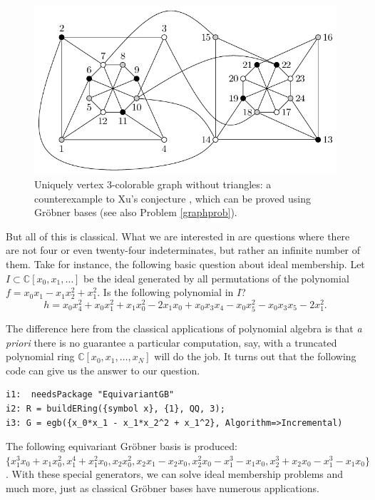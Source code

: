 \begin{figure}
\begin{center}
\includegraphics[width=.8 \linewidth]{akbarigraph.pdf}
\caption{Uniquely vertex 3-colorable graph without triangles: a counterexample \cite{akbari2001kr} to Xu's conjecture \cite{shaoji1990size}, which can be proved using Gr\"obner bases \cite{hillar2008algebraic} (see also Problem \ref{graphprob}).}\label{graph}
\end{center}
\end{figure}

But all of this is classical.  What we are interested in are questions where there are not four or even twenty-four indeterminates, but rather an infinite number of them.  Take for instance, the following basic question about ideal membership.  Let $I \subset \mathbb C[x_0,x_1,\ldots]$ be the ideal generated by all permutations of the polynomial $f = x_0 x_1 - x_1 x_2^2 +x_1^2$.  Is the following polynomial in $I$?
\[ h = x_0 x_4^2 + x_0 x_1^2  +x_1 x_0^2 - 2 x_1 x_0 + x_0 x_3 x_4 - x_0 x_5^2 - x_0 x_3 x_5 - 2 x_1^2.\]

The difference here from the classical applications of polynomial algebra is that \textit{a priori} there is no guarantee a particular computation, say, with a truncated polynomial ring $\mathbb C[x_0,x_1,\ldots, x_N]$ will do the job.  It turns out that the following code can give us the answer to our question.
\begin{M2}
\begin{verbatim}
i1:  needsPackage "EquivariantGB"
i2: R = buildERing({symbol x}, {1}, QQ, 3);
i3: G = egb({x_0*x_1 - x_1*x_2^2 + x_1^2}, Algorithm=>Incremental)
\end{verbatim}
\end{M2}  
\medskip
The following equivariant Gr\"obner basis is produced: $\{x_1^3 x_0+x_1 x_0^2, x_1^4+x_1^2 x_0, x_2 x_0^2, x_2 x_1-x_2 x_0, x_2^2 x_0-x_1^3-x_1 x_0, x_2^3+x_2 x_0-x_1^3-x_1 x_0\}$.  With these special generators, we can solve ideal membership problems and much more, just as classical Gr\"obner bases have numerous applications.  %

